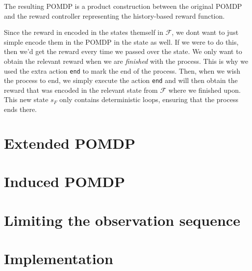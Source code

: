 


The resulting POMDP is a product construction between the original POMDP and the reward controller representing the history-based reward function. 

Since the reward in encoded in the states themself in $\mathcal{F}$, we dont want to just simple encode them in the POMDP in the state as well. If we were to do this, then we'd get the reward every time we passed over the state. We only want to obtain the relevant reward when we are \textit{finished} with the process. This is why we used the extra action \texttt{end} to mark the end of the process. Then, when we wish the process to end, we simply execute the action \texttt{end} and will then obtain the reward that was encoded in the relevant state from $\mathcal{F}$ where we finished upon. This new state $s_F$ only contains deterministic loops, ensuring that the process ends there. 

\section{Extended POMDP}


\section{Induced POMDP}


\section{Limiting the observation sequence}


\section{Implementation}


